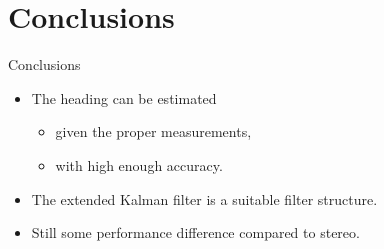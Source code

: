\documentclass{beamer}
\begin{document}
\section{Conclusions}

\begin{frame}{Conclusions}
	\begin{itemize}
		\item The heading can be estimated
		\begin{itemize}
			\item given the proper measurements,
			\item with high enough accuracy.
		\end{itemize}
		\item The extended Kalman filter is a suitable filter structure.
		\item Still some performance difference compared to stereo.
	\end{itemize}
\end{frame}
\end{document}
